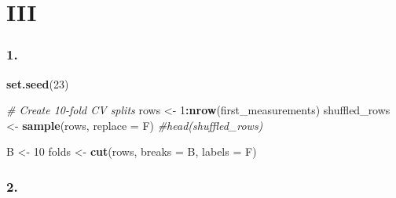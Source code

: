 \documentclass[
]{article}
\newenvironment{Shaded}{\begin{snugshade}}{\end{snugshade}}
\newcommand{\AttributeTok}[1]{\textcolor[rgb]{0.13,0.29,0.53}{#1}}
\newcommand{\CommentTok}[1]{\textcolor[rgb]{0.56,0.35,0.01}{\textit{#1}}}
\newcommand{\DecValTok}[1]{\textcolor[rgb]{0.00,0.00,0.81}{#1}}
\newcommand{\FunctionTok}[1]{\textcolor[rgb]{0.13,0.29,0.53}{\textbf{#1}}}
\newcommand{\NormalTok}[1]{#1}
\newcommand{\OtherTok}[1]{\textcolor[rgb]{0.56,0.35,0.01}{#1}}
\newcommand{\SpecialCharTok}[1]{\textcolor[rgb]{0.81,0.36,0.00}{\textbf{#1}}}
\begin{document}
\section{III}\label{iii}

\subsubsection{1.}\label{section-6}

\begin{Shaded}
\begin{Highlighting}[]
\FunctionTok{set.seed}\NormalTok{(}\DecValTok{23}\NormalTok{)  }

\CommentTok{\# Create 10{-}fold CV splits}
\NormalTok{rows }\OtherTok{\textless{}{-}} \DecValTok{1}\SpecialCharTok{:}\FunctionTok{nrow}\NormalTok{(first\_measurements)}
\NormalTok{shuffled\_rows }\OtherTok{\textless{}{-}} \FunctionTok{sample}\NormalTok{(rows, }\AttributeTok{replace =}\NormalTok{ F)}
\CommentTok{\#head(shuffled\_rows)}

\NormalTok{B }\OtherTok{\textless{}{-}} \DecValTok{10}
\NormalTok{folds }\OtherTok{\textless{}{-}} \FunctionTok{cut}\NormalTok{(rows, }\AttributeTok{breaks =}\NormalTok{ B, }\AttributeTok{labels =}\NormalTok{ F)}
\end{Highlighting}
\end{Shaded}

\subsubsection{2.}\label{section-7}
\end{document}
